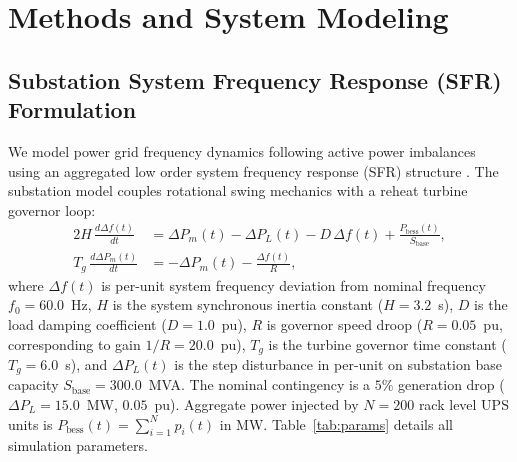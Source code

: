 \documentclass[preprint,12pt]{elsarticle}
\begin{document}
\section{Methods and System Modeling}
\label{sec:methods}

\subsection{Substation System Frequency Response (SFR) Formulation}
\label{sec:sfr}

We model power grid frequency dynamics following active power imbalances using an aggregated low order system frequency response (SFR) structure \cite{anderson1990}. The substation model couples rotational swing mechanics with a reheat turbine governor loop:
\begin{align}
2H\,\frac{d\Delta f(t)}{dt} &= \Delta P_m(t) - \Delta P_L(t) - D\,\Delta f(t) + \frac{P_{\mathrm{bess}}(t)}{S_{\mathrm{base}}}, \label{eq:swing}\\
T_g\,\frac{d\Delta P_m(t)}{dt} &= -\Delta P_m(t) - \frac{\Delta f(t)}{R}, \label{eq:governor}
\end{align}
where $\Delta f(t)$ is per-unit system frequency deviation from nominal frequency $f_0 = 60.0$~Hz, $H$ is the system synchronous inertia constant ($H=3.2$~s), $D$ is the load damping coefficient ($D=1.0$~pu), $R$ is governor speed droop ($R=0.05$~pu, corresponding to gain $1/R = 20.0$~pu), $T_g$ is the turbine governor time constant ($T_g=6.0$~s), and $\Delta P_L(t)$ is the step disturbance in per-unit on substation base capacity $S_{\mathrm{base}} = 300.0$~MVA. The nominal contingency is a $5\%$ generation drop ($\Delta P_L = 15.0$~MW, $0.05$~pu). Aggregate power injected by $N=200$ rack level UPS units is $P_{\mathrm{bess}}(t) = \sum_{i=1}^N p_i(t)$ in MW. Table~\ref{tab:params} details all simulation parameters.
\end{document}
